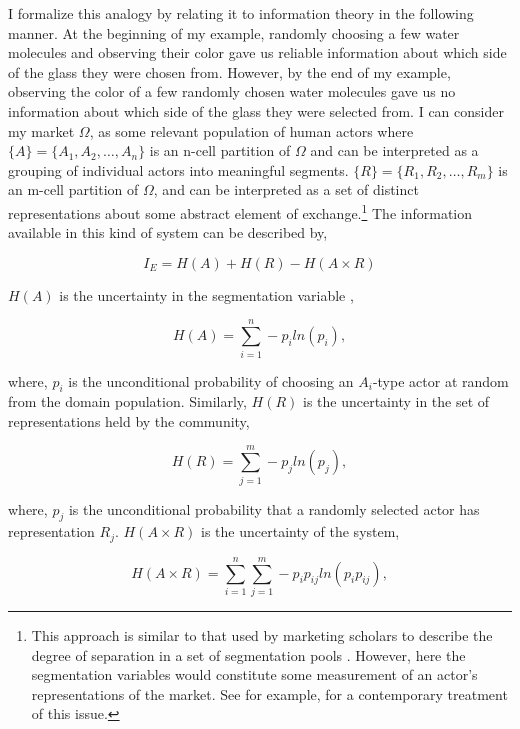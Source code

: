 I formalize this analogy by relating it to information theory in the following manner. At the beginning of my example, randomly choosing a few water molecules and observing their color gave us reliable information about which side of the glass they were chosen from. However, by the end of my example, observing the color of a few randomly chosen water molecules gave us no information about which side of the glass they were selected from.  I can consider my market $\Omega$, as some relevant population of human actors where $\{A\} = \{A_1, A_2,\ldots,A_n\}$ is an n-cell partition of $\Omega$ and can be interpreted as a grouping of individual actors into meaningful segments. $\{R\} = \{R_1, R_2,\ldots,R_m\}$ is an m-cell partition of $\Omega$, and can be interpreted as a set of distinct representations about some abstract element of exchange.\footnote{This approach is similar to that used by marketing scholars to describe the degree of separation in a set of segmentation pools \citep[see e.g.][]{ramaswamy1993, kamakura1995}. However, here the segmentation variables would constitute some measurement of an actor's representations of the market. See for example, \citet{franke2004} for a contemporary treatment of this issue.}  The information available in this kind of system can be described by,

\begin{equation}
I_E = H(A)+H(R)-H(A \times R)
\end{equation}

$H(A)$ is the uncertainty in the segmentation variable \citep{shannon1948, ramaswamy1993}, 

\begin{equation}
\nonumber H(A) = \sum_{i=1}^n -p_i ln(p_i),
\end{equation}

\noindent where, $p_i$ is the unconditional probability of choosing an $A_i$-type actor at random from the domain population. Similarly, $H(R)$ is the uncertainty in the set of representations held by the community,

\begin{equation}
\nonumber H(R) = \sum_{j=1}^m -p_j ln(p_j),
\end{equation}

\noindent where, $p_j$ is the unconditional probability that a randomly selected actor has representation $R_j$. $H(A \times R)$ is the uncertainty of the system,

\begin{equation}
\nonumber H(A \times R) = \sum_{i=1}^n\sum_{j=1}^m -p_ip_{ij}ln(p_ip_{ij}),
\end{equation}

